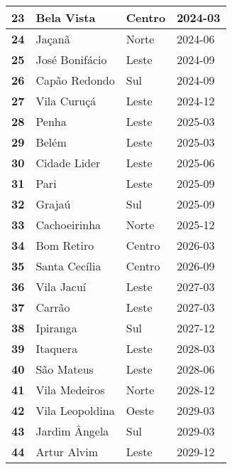 \begin{table}[H]
\begin{tabular}{l|l|l|l}
		\textbf{23} & Bela Vista & Centro & 2024-03\\ \hline
		\textbf{24} & Jaçanã & Norte & 2024-06\\ \hline
		\textbf{25} & José Bonifácio & Leste & 2024-09\\ \hline
		\textbf{26} & Capão Redondo & Sul & 2024-09\\ \hline
		\textbf{27} & Vila Curuçá & Leste & 2024-12\\ \hline
		\textbf{28} & Penha & Leste & 2025-03\\ \hline
		\textbf{29} & Belém & Leste & 2025-03\\ \hline
		\textbf{30} & Cidade Lider & Leste & 2025-06\\ \hline
		\textbf{31} & Pari & Leste & 2025-09\\ \hline
		\textbf{32} & Grajaú & Sul & 2025-09\\ \hline
		\textbf{33} & Cachoeirinha & Norte & 2025-12\\ \hline
		\textbf{34} & Bom Retiro & Centro & 2026-03\\ \hline
		\textbf{35} & Santa Cecília & Centro & 2026-09\\ \hline
		\textbf{36} & Vila Jacuí & Leste & 2027-03\\ \hline
		\textbf{37} & Carrão & Leste & 2027-03\\ \hline
		\textbf{38} & Ipiranga & Sul & 2027-12\\ \hline
		\textbf{39} & Itaquera & Leste & 2028-03\\ \hline
		\textbf{40} & São Mateus & Leste & 2028-06\\ \hline
		\textbf{41} & Vila Medeiros & Norte & 2028-12\\ \hline
		\textbf{42} & Vila Leopoldina & Oeste & 2029-03\\ \hline
		\textbf{43} & Jardim Ângela & Sul & 2029-03\\ \hline
		\textbf{44} & Artur Alvim & Leste & 2029-12\\ 	
	\end{tabular}
\end{table}

